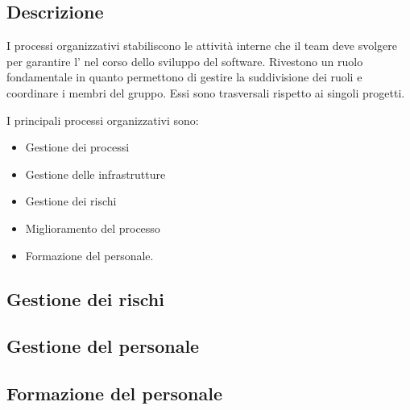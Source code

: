 \documentclass[../norme-di-progetto.tex]{subfiles}
\begin{document}
\subsection{Descrizione}%
\label{sub:processi_organizzativi/descrizione}

I processi organizzativi stabiliscono le attività interne che il team deve svolgere per garantire l' nel corso dello sviluppo del software.
Rivestono un ruolo fondamentale in quanto permettono di gestire la suddivisione dei ruoli e coordinare i membri del gruppo.
Essi sono trasversali rispetto ai singoli progetti.

I principali processi organizzativi sono:

\begin{itemize}
  \item Gestione dei processi
  \item Gestione delle infrastrutture
  \item Gestione dei rischi
  \item Miglioramento del processo
  \item Formazione del personale.
\end{itemize}

\subsection{Gestione dei rischi}%
\label{sub:gestione_dei_rischi}



\subsection{Gestione del personale}%
\label{sub:gestione_del_personale}



\subsection{Formazione del personale}%
\label{sub:formazione_del_personale}


\end{document}

